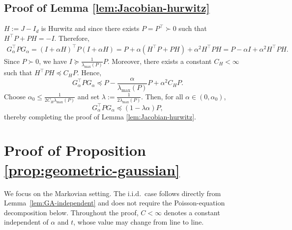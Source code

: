 \documentclass[11pt,letterpaper]{article}
\theoremstyle{plain}
\theoremstyle{definition}
\theoremstyle{remark}
\begin{document}
\subsection{Proof of Lemma \ref{lem:Jacobian-hurwitz}}\label{sec:proof-Jacobian-hurwitz}
\(H:=J-I_d\) is Hurwitz and since there exists \(P=P^\top\succ0\) such that $H^\top P+PH=-I.$ Therefore,
\begin{align*}
G_\alpha^\top P G_\alpha
=
(I+\alpha H)^\top P(I+\alpha H) =
P+\alpha(H^\top P+PH)+\alpha^2 H^\top P H =
P-\alpha I+\alpha^2 H^\top P H.
\end{align*}
Since \(P\succ 0\), we have $I \succeq \frac{1}{\lambda_{\max}(P)}P.$ Moreover, there exists a constant \(C_H<\infty\) such that $H^\top P H \preceq C_H P.$ Hence,
\[
G_\alpha^\top P G_\alpha
\preceq
P-\frac{\alpha}{\lambda_{\max}(P)}P+\alpha^2 C_H P.
\]
Choose $\alpha_0
\le
\frac{1}{2C_H\lambda_{\max}(P)}$ and set $\lambda:=\frac{1}{2\lambda_{\max}(P)}.$ Then, for all \(\alpha\in(0,\alpha_0)\),
\[
G_\alpha^\top P G_\alpha
\preceq
(1-\lambda\alpha)P,
\]
thereby completing the proof of Lemma \ref{lem:Jacobian-hurwitz}.
\section{Proof of Proposition \ref{prop:geometric-gaussian}}
\label{sec:proof-geometric-gaussian}

We focus on the Markovian setting. The i.i.d.\ case follows directly from
Lemma~\ref{lem:GA-independent} and does not require the Poisson-equation
decomposition below. Throughout the proof, \(C<\infty\) denotes a constant
independent of \(\alpha\) and \(t\), whose value may change from line to line.
\end{document}
